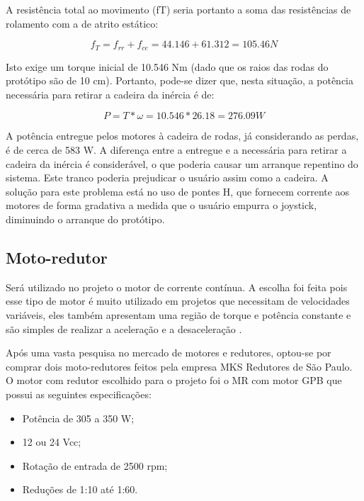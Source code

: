 A resistência total ao movimento (fT) seria portanto a soma das resistências de rolamento com a de atrito estático:

\begin{equation}
f_T = f_{rr} + f_{ce} = 44.146+61.312 = 105.46 N
\end{equation}

Isto exige um torque inicial de 10.546 Nm (dado que os raios das rodas do protótipo são de 10 cm). Portanto, pode-se dizer que, nesta situação, a potência necessária para retirar a cadeira da inércia é de:

\begin{equation}
P = T*\omega = 10.546*26.18 = 276.09 W
\end{equation}

	A potência entregue pelos motores à cadeira de rodas, já considerando as perdas, é de cerca de 583 W. A diferença entre a entregue e a necessária para retirar a cadeira da inércia é considerável, o que poderia causar um arranque repentino do sistema. Este tranco poderia prejudicar o usuário assim como a cadeira. A solução para este problema está no uso de pontes H, que fornecem corrente aos motores de forma gradativa a medida que o usuário empurra o joystick, diminuindo o arranque do protótipo.

\subsection{Moto-redutor}

Será utilizado no projeto o motor de corrente contínua. A escolha foi feita pois esse tipo de motor é muito utilizado em projetos que necessitam de velocidades variáveis, eles também apresentam uma região de torque e potência constante e são simples de realizar a aceleração e a desaceleração \cite{manual_bateria_unipower}.

Após uma vasta pesquisa no mercado de motores e redutores, optou-se por comprar dois moto-redutores feitos pela empresa MKS Redutores de São Paulo. O motor com redutor escolhido para o projeto foi o MR com motor GPB que possui as seguintes especificações:

\begin{itemize}
  \item Potência de 305 a 350 W;
  \item 12 ou 24 Vcc;
  \item Rotação de entrada de 2500 rpm;
  \item Reduções de 1:10 até 1:60.
\end{itemize}

